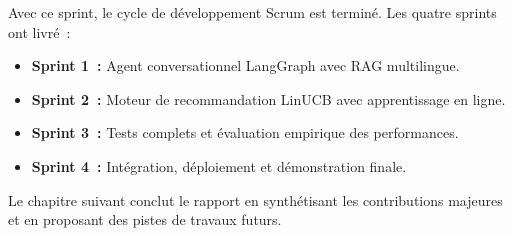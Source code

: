 Avec ce sprint, le cycle de développement Scrum est terminé. Les quatre sprints ont livré~:
\begin{itemize}
    \item \textbf{Sprint 1~:} Agent conversationnel LangGraph avec RAG multilingue.
    \item \textbf{Sprint 2~:} Moteur de recommandation LinUCB avec apprentissage en ligne.
    \item \textbf{Sprint 3~:} Tests complets et évaluation empirique des performances.
    \item \textbf{Sprint 4~:} Intégration, déploiement et démonstration finale.
\end{itemize}

Le chapitre suivant conclut le rapport en synthétisant les contributions majeures et en
proposant des pistes de travaux futurs.
